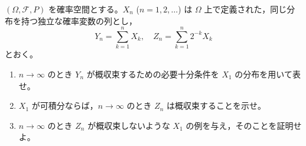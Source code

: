 \documentclass[12pt]{jlreq}
\begin{document}
$(\Omega, \mathcal{F}, P)$ を確率空間とする。$X_n$ ($n=1,2,\dots$) は $\Omega$ 上で定義された，同じ分布を持つ独立な確率変数の列とし，
\[
  Y_n = \sum_{k=1}^n X_k,\quad Z_n = \sum_{k=1}^n 2^{-k} X_k
\]
とおく。

\begin{enumerate}
  \item $n\to\infty$ のとき $Y_n$ が概収束するための必要十分条件を $X_1$ の分布を用いて表せ。
  \item $X_1$ が可積分ならば，$n\to\infty$ のとき $Z_n$ は概収束することを示せ。
  \item $n\to\infty$ のとき $Z_n$ が概収束しないような $X_1$ の例を与え，そのことを証明せよ。
\end{enumerate}
\end{document}

